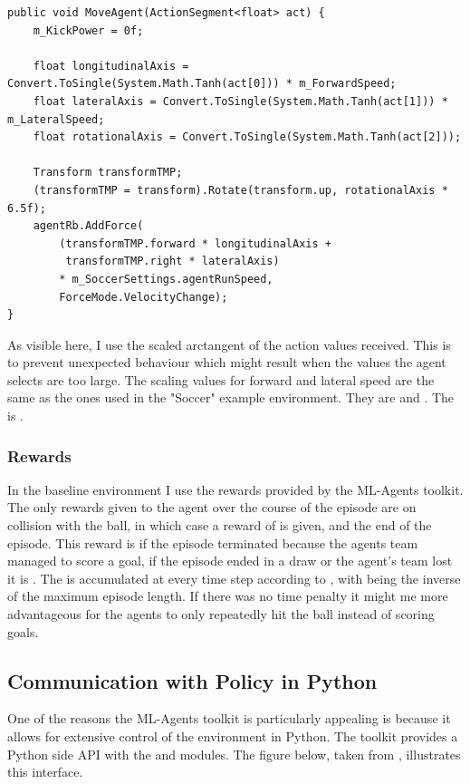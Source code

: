 \begin{lstlisting}[basicstyle=\footnotesize]
public void MoveAgent(ActionSegment<float> act) {
    m_KickPower = 0f;

    float longitudinalAxis = Convert.ToSingle(System.Math.Tanh(act[0])) * m_ForwardSpeed;
    float lateralAxis = Convert.ToSingle(System.Math.Tanh(act[1])) * m_LateralSpeed;
    float rotationalAxis = Convert.ToSingle(System.Math.Tanh(act[2]));

    Transform transformTMP;
    (transformTMP = transform).Rotate(transform.up, rotationalAxis * 6.5f);
    agentRb.AddForce(
        (transformTMP.forward * longitudinalAxis +
         transformTMP.right * lateralAxis)
        * m_SoccerSettings.agentRunSpeed,
        ForceMode.VelocityChange);
}
\end{lstlisting}
\noindent
As visible here, I use the scaled arctangent of the action values received. This is to prevent unexpected behaviour which might result when the values the agent selects are too large. The scaling values for forward and lateral speed are the same as the ones used in the "Soccer" example environment. They are  and . The  is .

\subsubsection{Rewards}\label{subsubsec:ip:environment:impl:rewards}
In the baseline environment I use the rewards provided by the ML-Agents toolkit. The only rewards given to the agent over the course of the episode are on collision with the ball, in which case a reward of  is given, and the end of the episode. This reward is  if the episode terminated because the agents team managed to score a goal, if the episode ended in a draw or the agent's team lost it is . The  is accumulated at every time step according to , with  being the inverse of the maximum episode length. If there was no time penalty it might me more advantageous for the agents to only repeatedly hit the ball instead of scoring goals.
\subsection{Communication with Policy in Python}\label{subsec:ip:environment:communication_python}
One of the reasons the ML-Agents toolkit is particularly appealing is because it allows for extensive control of the environment in Python. The toolkit provides a Python side API with the  and  modules. The figure below, taken from \cite[p. 12]{juliani2020unity}, illustrates this interface.

